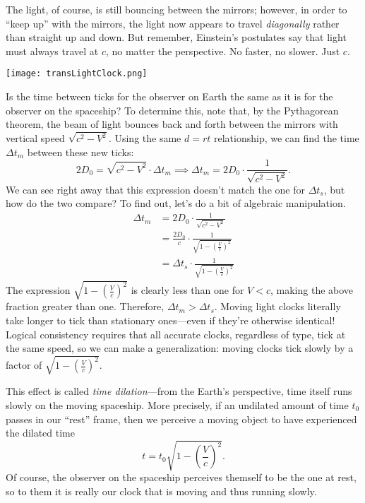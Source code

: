 \documentclass[../p023main.tex]{subfiles}
\begin{document}
The light, of course, is still bouncing between the mirrors; however, in order to ``keep up'' with the mirrors, the light now appears to travel \textit{diagonally} rather than straight up and down.
But remember, Einstein's postulates say that light must always travel at $c$, no matter the perspective.
No faster, no slower.
Just $c$.
\begin{center}
    \texttt{[image: transLightClock.png]}
\end{center}
Is the time between ticks for the observer on Earth the same as it is for the observer on the spaceship?
To determine this, note that, by the Pythagorean theorem, the beam of light bounces back and forth between the mirrors with vertical speed $\sqrt{c^2 - V^2}$.
Using the same $d = rt$ relationship, we can find the time $\Delta t_m$ between these new ticks:
\[ 2D_0 = \sqrt{c^2 - V^2} \cdot \Delta t_m \implies \Delta t_m = 2D_0 \cdot \frac{1}{\sqrt{c^2 - V^2}}. \]
We can see right away that this expression doesn't match the one for $\Delta t_s$, but how do the two compare?
To find out, let's do a bit of algebraic manipulation.
\begin{align*}
    \Delta t_m &= 2D_0 \cdot \frac{1}{\sqrt{c^2 - V^2}} \\
    &= \frac{2D_0}{c} \cdot \frac{1}{\sqrt{1 - \left( \frac{V}{c} \right)^2}} \\
    &= \Delta t_s \cdot \frac{1}{\sqrt{1 - \left( \frac{V}{c} \right)^2}}
\end{align*}
The expression $\sqrt{1 - \left( \frac{V}{c} \right)^2}$ is clearly less than one for $V < c$, making the above fraction greater than one.
Therefore, $\Delta t_m > \Delta t_s$.
Moving light clocks literally take longer to tick than stationary ones---even if they're otherwise identical!
Logical consistency requires that all accurate clocks, regardless of type, tick at the same speed, so we can make a generalization: moving clocks tick slowly by a factor of $\sqrt{1 - \left( \frac{V}{c} \right)^2}$.

This effect is called \textit{time dilation}---from the Earth's perspective, time itself runs slowly on the moving spaceship.
More precisely, if an undilated amount of time $t_0$ passes in our ``rest'' frame, then we perceive a moving object to have experienced the dilated time
\[ t = t_0 \sqrt{1 - \left( \frac{V}{c} \right)^2}. \]
Of course, the observer on the spaceship perceives themself to be the one at rest, so to them it is really our clock that is moving and thus running slowly.
\end{document}
